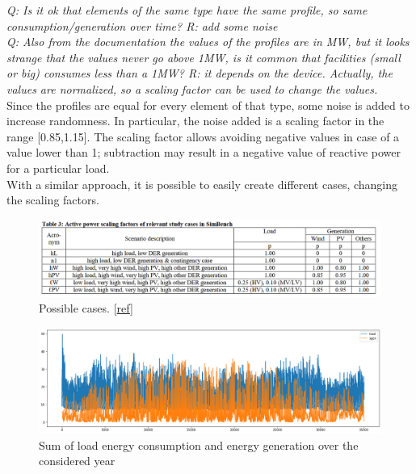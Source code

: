 \emph{Q: Is it ok that elements of the same type have the same profile, so same consumption/generation over time? R: add some noise} \\
\emph{Q: Also from the documentation the values of the profiles are in MW, but it looks strange that the values never go above 1MW, is it common that facilities (small or big) consumes less than a 1MW? R: it depends on the device. Actually, the values are normalized, so a scaling factor can be used to change the values.} \\

Since the profiles are equal for every element of that type, some noise is added to increase randomness. In particular, the noise added is a scaling factor in the range [0.85,1.15]. The scaling factor allows avoiding negative values in case of a value lower than 1; subtraction may result in a negative value of reactive power for a particular load. \\

With a similar approach, it is possible to easily create different cases, changing the scaling factors.

\begin{figure}[H]
\centering
    \includegraphics[width=.9\linewidth]{images/MVOberr/Cases.PNG}
\caption{Possible cases. [\href{https://www.cired-repository.org/bitstream/handle/20.500.12455/526/CIRED \%202019 \%20- \%20139.pdf?sequence=1&isAllowed=y}{ref}] }
\label{fig:gym_anm_net}
\end{figure} 



\begin{figure}[h]
\centering
    \includegraphics[width=.9\linewidth]{images/MVOberr/Load&Gens.png}
\caption{Sum of load energy consumption and energy generation over the considered year}
\label{fig:gym_anm_net}
\end{figure}


